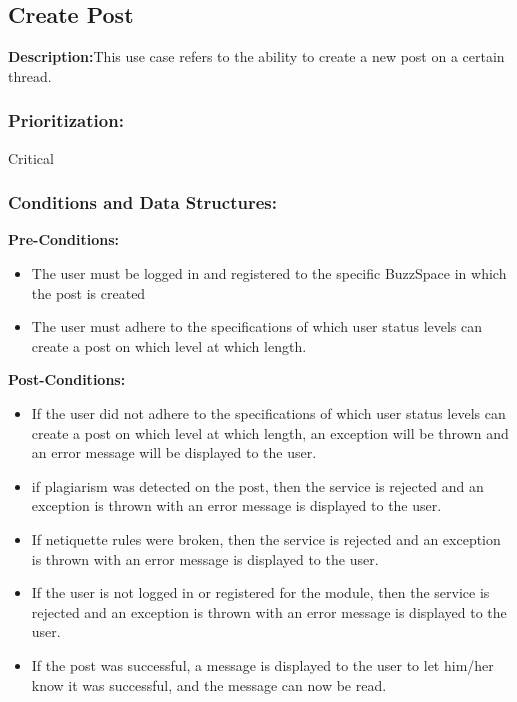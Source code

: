 \documentclass[a4paper,11pt]{article}
\begin{document}
\subsection{Create Post}
\textbf{Description:}This use case refers to the ability to create a new post on a certain thread. 
\subsubsection{Prioritization:} Critical
\subsubsection{Conditions and Data Structures:}
\textbf{Pre-Conditions:}
\begin{itemize}
	\item The user must be logged in and registered to the specific BuzzSpace in which the post is created
	\item The user must adhere to the specifications of which user status levels can create a post on which level at which length.
\end{itemize}
\textbf{Post-Conditions:}
\begin{itemize}
	\item If the user did not adhere to the specifications of which user status levels can create a post on which level at which length, an exception will be thrown and an error
	message will be displayed to the user.
	\item if plagiarism was detected on the post, then the service is rejected and an exception is thrown with an error message is displayed to the user.
	\item If netiquette rules were broken,  then the service is rejected and an exception is thrown with an error message is displayed to the user.
	\item If the user is not logged in or registered for the module, then the service is rejected and an exception is thrown with an error message is displayed to the user.
	\item If the post was successful, a message is displayed to the user to let him/her know it was successful, and the message can now be read.
\end{itemize}
\end{document}
